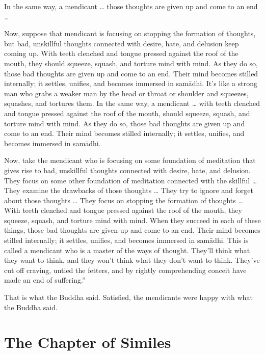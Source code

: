 \documentclass[12pt,openany]{book}%
\let\oldcontentsline\contentsline
\newcommand{\nopagecontentsline}[3]{\oldcontentsline{#1}{#2}{}}
\newcommand*{\tocchapterline}[1]{\bfseries\itshape{#1}}
\begin{document}
In the same way, a mendicant … those thoughts are given up and come to an end … 

Now, suppose that mendicant is focusing on stopping the formation of thoughts, but bad, unskillful thoughts connected with desire, hate, and delusion keep coming up. With teeth clenched and tongue pressed against the roof of the mouth, they should squeeze, squash, and torture mind with mind. As they do so, those bad thoughts are given up and come to an end. Their mind becomes stilled internally; it settles, unifies, and becomes immersed in \textsanskrit{samādhi}. It’s like a strong man who grabs a weaker man by the head or throat or shoulder and squeezes, squashes, and tortures them. In the same way, a mendicant … with teeth clenched and tongue pressed against the roof of the mouth, should squeeze, squash, and torture mind with mind. As they do so, those bad thoughts are given up and come to an end. Their mind becomes stilled internally; it settles, unifies, and becomes immersed in \textsanskrit{samādhi}. 

Now, take the mendicant who is focusing on some foundation of meditation that gives rise to bad, unskillful thoughts connected with desire, hate, and delusion. They focus on some other foundation of meditation connected with the skillful … They examine the drawbacks of those thoughts … They try to ignore and forget about those thoughts … They focus on stopping the formation of thoughts … With teeth clenched and tongue pressed against the roof of the mouth, they squeeze, squash, and torture mind with mind. When they succeed in each of these things, those bad thoughts are given up and come to an end. Their mind becomes stilled internally; it settles, unifies, and becomes immersed in \textsanskrit{samādhi}. This is called a mendicant who is a master of the ways of thought. They’ll think what they want to think, and they won’t think what they don’t want to think. They’ve cut off craving, untied the fetters, and by rightly comprehending conceit have made an end of suffering.” 

That is what the Buddha said. Satisfied, the mendicants were happy with what the Buddha said. 

%
\chapter*{The Chapter of Similes }
\addcontentsline{toc}{chapter}{\tocchapterline{The Chapter of Similes }}
\addtocontents{toc}{\let\protect\contentsline\protect\oldcontentsline}
\end{document}
